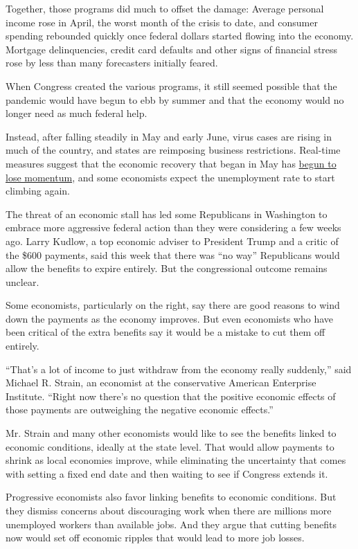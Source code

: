 Together, those programs did much to offset the damage: Average personal
income rose in April, the worst month of the crisis to date, and
consumer spending rebounded quickly once federal dollars started flowing
into the economy. Mortgage delinquencies, credit card defaults and other
signs of financial stress rose by less than many forecasters initially
feared.

When Congress created the various programs, it still seemed possible
that the pandemic would have begun to ebb by summer and that the economy
would no longer need as much federal help.

Instead, after falling steadily in May and early June, virus cases are
rising in much of the country, and states are reimposing business
restrictions. Real-time measures suggest that the economic recovery that
began in May has
\href{https://www.nytimes.com/live/2020/07/15/business/stock-market-today-coronavirus\#surging-virus-cases-and-renewed-lockdowns-threaten-economic-recovery}{begun
to lose momentum}, and some economists expect the unemployment rate to
start climbing again.

The threat of an economic stall has led some Republicans in Washington
to embrace more aggressive federal action than they were considering a
few weeks ago. Larry Kudlow, a top economic adviser to President Trump
and a critic of the \$600 payments, said this week that there was ``no
way'' Republicans would allow the benefits to expire entirely. But the
congressional outcome remains unclear.

Some economists, particularly on the right, say there are good reasons
to wind down the payments as the economy improves. But even economists
who have been critical of the extra benefits say it would be a mistake
to cut them off entirely.

``That's a lot of income to just withdraw from the economy really
suddenly,'' said Michael R. Strain, an economist at the conservative
American Enterprise Institute. ``Right now there's no question that the
positive economic effects of those payments are outweighing the negative
economic effects.''

Mr. Strain and many other economists would like to see the benefits
linked to economic conditions, ideally at the state level. That would
allow payments to shrink as local economies improve, while eliminating
the uncertainty that comes with setting a fixed end date and then
waiting to see if Congress extends it.

Progressive economists also favor linking benefits to economic
conditions. But they dismiss concerns about discouraging work when there
are millions more unemployed workers than available jobs. And they argue
that cutting benefits now would set off economic ripples that would lead
to more job losses.

